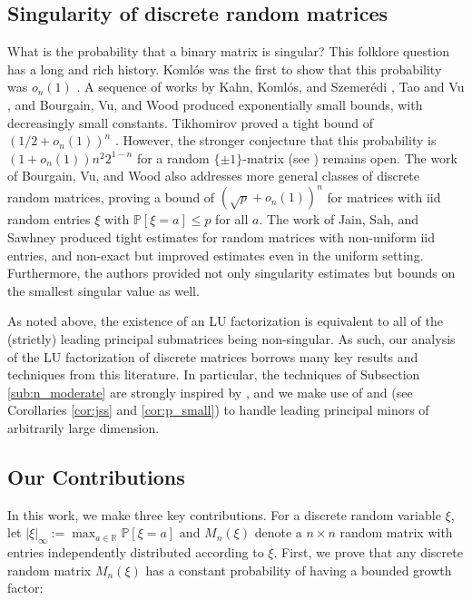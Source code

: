 \documentclass[reqno]{amsart}
\numberwithin{equation}{section}
\begin{document}
\subsection{Singularity of discrete random matrices} What is the probability that a binary matrix is singular? This folklore question has a long and rich history. Koml{\'o}s was the first to show that this probability was $o_n(1)$ \cite{komlos1967determinant}. A sequence of works by Kahn, Koml{\'o}s, and Szemer{\'e}di \cite{kahn1995probability}, Tao and Vu \cite{tao2005random,tao2007singularity}, and Bourgain, Vu, and Wood \cite{bourgain2010singularity} produced exponentially small bounds, with decreasingly small constants. Tikhomirov proved a tight bound of $(1/2 + o_n(1))^n$ \cite{tikhomirov2020singularity}. However, the stronger conjecture that this probability is $(1+o_n(1))n^2 2^{1-n}$ for a random $\{\pm 1\}$-matrix (see \cite[Equation 1]{kahn1995probability}) remains open. The work of Bourgain, Vu, and Wood also addresses more general classes of discrete random matrices, proving a bound of $(\sqrt{p}+o_n(1))^n$ for matrices with iid random entries $\xi$ with $\mathbb{P}[\xi = a] \le p$ for all $a$. The work of Jain, Sah, and Sawhney \cite{jain2021singularity} produced tight estimates for random matrices with non-uniform iid entries, and non-exact but improved estimates even in the uniform setting. Furthermore, the authors provided not only singularity estimates but bounds on the smallest singular value as well.

As noted above, the existence of an LU factorization is equivalent to all of the (strictly) leading principal submatrices being non-singular. As such, our analysis of the LU factorization of discrete matrices borrows many key results and techniques from this literature. In particular, the techniques of Subsection \ref{sub:n_moderate} are strongly inspired by \cite{komlos1967determinant}, and we make use of \cite[Theorem 1.4]{jain2021singularity} and \cite[Theorem 1.4]{bourgain2010singularity} (see Corollaries \ref{cor:jss} and \ref{cor:p_small}) to handle leading principal minors of arbitrarily large dimension.


\subsection{Our Contributions} In this work, we make three key contributions. For a discrete random variable $\xi$, let $|\xi|_{\infty}:= \max_{a \in \mathbb{R}} \mathbb{P} \left[\xi = a \right]$ and  $M_n(\xi)$ denote a $n \times n$ random matrix with entries independently distributed according to $\xi$. First, we prove that any discrete random matrix $M_n(\xi)$ has a constant probability of having a bounded growth factor:
\end{document}
